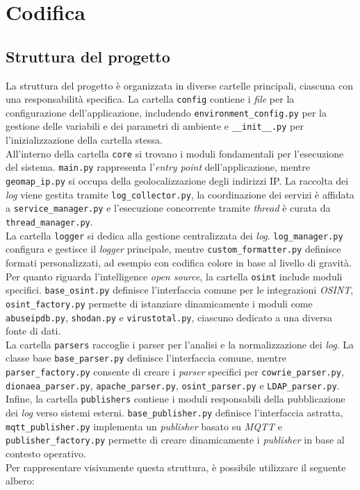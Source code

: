 \section{Codifica}
\subsection{Struttura del progetto}
\normalsize
La struttura del progetto è organizzata in diverse cartelle principali, ciascuna con una responsabilità specifica. La cartella \texttt{config} contiene i \textit{file} per la configurazione dell'applicazione, includendo \texttt{environment\_config.py} per la gestione delle variabili e dei parametri di ambiente e \texttt{\_\_init\_\_.py} per l'inizializzazione della cartella stessa.\\
All'interno della cartella \texttt{core} si trovano i moduli fondamentali per l'esecuzione del sistema. \texttt{main.py} rappresenta l'\textit{entry point} dell'applicazione, mentre \texttt{geomap\_ip.py} si occupa della geolocalizzazione degli indirizzi IP. La raccolta dei \textit{log} viene gestita tramite \texttt{log\_collector.py}, la coordinazione dei servizi è affidata a \texttt{service\_manager.py} e l'esecuzione concorrente tramite \textit{thread} è curata da \texttt{thread\_manager.py}.\\
La cartella \texttt{logger} si dedica alla gestione centralizzata dei \textit{log}. \texttt{log\_manager.py} configura e gestisce il \textit{logger} principale, mentre \texttt{custom\_formatter.py} definisce formati personalizzati, ad esempio con codifica colore in base al livello di gravità.\\
Per quanto riguarda l'intelligence \textit{open source}, la cartella \texttt{osint} include moduli specifici. \texttt{base\_osint.py} definisce l'interfaccia comune per le integrazioni \textit{OSINT}, \texttt{osint\_factory.py} permette di istanziare dinamicamente i moduli come \texttt{abuseipdb.py}, \texttt{shodan.py} e \texttt{virustotal.py}, ciascuno dedicato a una diversa fonte di dati.\\
La cartella \texttt{parsers} raccoglie i parser per l'analisi e la normalizzazione dei \textit{log}. La classe base \texttt{base\_parser.py} definisce l'interfaccia comune, mentre \texttt{parser\_factory.py} consente di creare i \textit{parser} specifici per \texttt{cowrie\_parser.py}, \texttt{dionaea\_parser.py}, \texttt{apache\_parser.py}, \texttt{osint\_parser.py} e \texttt{LDAP\_parser.py}.\\
Infine, la cartella \texttt{publishers} contiene i moduli responsabili della pubblicazione dei \textit{log} verso sistemi esterni. \texttt{base\_publisher.py} definisce l'interfaccia astratta, \texttt{mqtt\_publisher.py} implementa un \textit{publisher} basato su \textit{MQTT} e \texttt{publisher\_factory.py} permette di creare dinamicamente i \textit{publisher} in base al contesto operativo.\\
Per rappresentare visivamente questa struttura, è possibile utilizzare il seguente albero:\\

